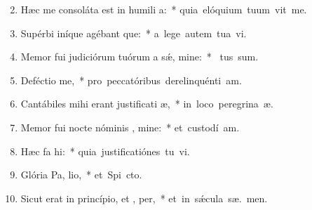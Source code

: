 \begin{flushleft}
\begin{enumerate}[leftmargin=*]
\setcounter{enumi}{1}

\item Hæc me consoláta est in humili a:~* \mbox{quia elóquium tuum vit me.}
\item Supérbi iníque agébant que:~* \mbox{a lege autem tua  vi.}
\item Memor fui judiciórum tuórum a s\'{\ae}, mine:~* \mbox{ tus sum.}
\item Deféctio  me,~* \mbox{pro peccatóribus derelinquénti  am.}
\item Cantábiles mihi erant justificati æ,~* \mbox{in loco peregrina æ.}
\item Memor fui nocte nóminis , mine:~* \mbox{et custodí  am.}
\item Hæc fa  hi:~* \mbox{quia justificatiónes tu vi.}
\item Glória Pa,  lio,~* \mbox{et Spi cto.}
\item Sicut erat in princípio, et ,  per,~* \mbox{et in s\'{\ae}cula sæ. men.}


\end{enumerate}
\end{flushleft}

